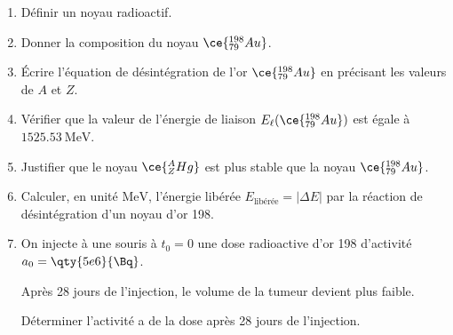 \begin{enumerate}
    \item Définir un noyau radioactif.
    \item Donner la composition du noyau $\ce{_{79}^{198}Au}$.
    \item Écrire l'équation de désintégration de l'or $\ce{_{79}^{198}Au}$ en
          précisant les valeurs de $A$ et $Z$.
    \item Vérifier que la valeur de l'énergie de liaison
          $E_{\ell}(\ce{_{79}^{198}Au})$ est égale à $\qty{1525.53}{\MeV}$.
    \item Justifier que le noyau $\ce{_{Z}^{A}Hg}$ est plus stable que la noyau
          $\ce{_{79}^{198}Au}$.
    \item Calculer, en unité $\unit{\MeV}$, l'énergie libérée
          $E_{\text{libérée}}=|\Delta E|$ par la réaction de désintégration d'un
          noyau d'or 198.
    \item On injecte à une souris à $t_{0}=0$ une dose radioactive d'or 198
          d'activité $a_{0}=\qty{5e6}{\Bq}$.

          Après 28 jours de l'injection, le volume de la tumeur devient plus
          faible.

          Déterminer l'activité a de la dose après 28 jours de l'injection.
\end{enumerate}

